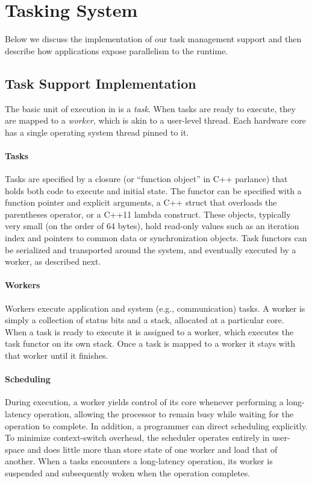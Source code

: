 \section{Tasking System}

Below we discuss the implementation of our task management support and then
describe how applications expose parallelism to the \Grappa runtime.

\subsection{Task Support Implementation}

The basic unit of execution in \Grappa is a {\em task}. When tasks are ready to
execute, they are mapped to a {\em worker,} which is akin to a user-level
thread. Each hardware core has a single operating system thread pinned to it.

\paragraph{Tasks} 
Tasks are specified by a closure (or ``function object'' in C++ parlance) that holds both code to execute and initial state. The functor can be specified with a function pointer and explicit arguments, a C++ struct that overloads the parentheses operator, or a C++11 lambda construct. These objects, typically very small (on the order of 64 bytes), hold read-only values such as an iteration index and pointers to common data or synchronization objects. Task functors can be serialized and transported around the system, and eventually executed by a worker, as described next.

\paragraph{Workers} Workers execute application and system (e.g.,
communication) tasks. A worker is simply a collection of status bits and a
stack, allocated at a particular core. When a task is ready to execute it
is assigned to a worker, which executes the task functor on its own stack. 
Once a task is mapped to a worker it stays with that worker until it finishes.

\paragraph{Scheduling} During execution, a worker yields control of its core
whenever performing a long-latency operation, allowing the processor to
remain busy while waiting for the operation to complete. In addition, a
programmer can direct scheduling explicitly.
To minimize context-switch overhead, the \Grappa scheduler
operates entirely in user-space and does little more than store state of one
worker and load that of another. When a tasks encounters a long-latency operation, its worker is suspended and subsequently woken when the operation completes. 


